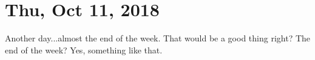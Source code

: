 \section{Thu, Oct 11, 2018}

Another day...almost the end of the week. That would be a good thing right? The end of the week? Yes, something like that.
